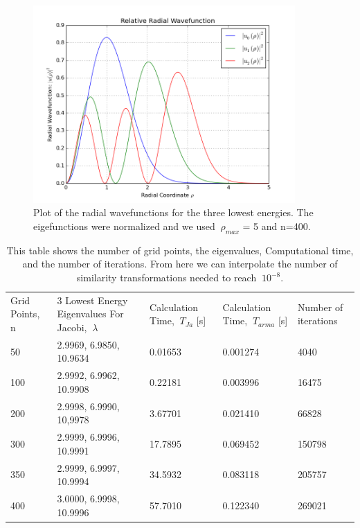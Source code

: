 \documentclass[11pt,a4wide]{article}
\begin{document}
\begin{figure}[H] 
\centering
\includegraphics[width=100mm]{NI.png}
\caption{ Plot of the radial wavefunctions for the three lowest energies. The eigefunctions were normalized and we used $\ \rho_{max}$ = 5 and n=400.\label{overflow}}
\end{figure}
\begin{table}[H]
\centering
\label{my-label}
\begin{tabular}{| m{2cm} | m{3cm} | m{3cm} | m{3cm} | m{3cm} |}
 \cline{1-5}
  Grid Points, n&  3 Lowest Energy Eigenvalues For Jacobi, $\ \lambda$&  Calculation Time, $\ T_{Ja}$ [s]&   Calculation Time, $\ T_{arma}$ [s]& Number of iterations \\ \cline{1-5}
 50&  2.9969, 6.9850, 10.9634&  0.01653& 0.001274& 4040\\ \cline{1-5}
 100& 2.9992, 6.9962, 10.9908&  0.22181& 0.003996& 16475\\ \cline{1-5}
 200& 2.9998, 6.9990, 10,9978&  3.67701& 0.021410& 66828\\ \cline{1-5}
 300& 2.9999, 6.9996, 10.9991&  17.7895& 0.069452& 150798\\ \cline{1-5}
 350& 2.9999, 6.9997, 10.9994&  34.5932& 0.083118& 205757\\ \cline{1-5}
 400& 3.0000, 6.9998, 10.9996&  57.7010& 0.122340& 269021\\ \cline{1-5}
\end{tabular}
\caption{This table shows the number of grid points, the eigenvalues, Computational time, and the number of iterations. From here we can interpolate the number of similarity transformations needed to reach $\ 10^{-8}$.  }
\end{table}
\end{document}
